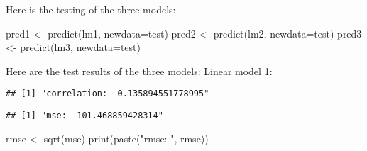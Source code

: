 \documentclass[
]{article}
\newenvironment{Shaded}{\begin{snugshade}}{\end{snugshade}}
\newcommand{\AttributeTok}[1]{\textcolor[rgb]{0.77,0.63,0.00}{#1}}
\newcommand{\DecValTok}[1]{\textcolor[rgb]{0.00,0.00,0.81}{#1}}
\newcommand{\FunctionTok}[1]{\textcolor[rgb]{0.00,0.00,0.00}{#1}}
\newcommand{\NormalTok}[1]{#1}
\newcommand{\OtherTok}[1]{\textcolor[rgb]{0.56,0.35,0.01}{#1}}
\newcommand{\SpecialCharTok}[1]{\textcolor[rgb]{0.00,0.00,0.00}{#1}}
\newcommand{\StringTok}[1]{\textcolor[rgb]{0.31,0.60,0.02}{#1}}
\begin{document}
Here is the testing of the three models:

\begin{Shaded}
\begin{Highlighting}[]
\NormalTok{pred1 }\OtherTok{\textless{}{-}} \FunctionTok{predict}\NormalTok{(lm1, }\AttributeTok{newdata=}\NormalTok{test)}
\NormalTok{pred2 }\OtherTok{\textless{}{-}} \FunctionTok{predict}\NormalTok{(lm2, }\AttributeTok{newdata=}\NormalTok{test)}
\NormalTok{pred3 }\OtherTok{\textless{}{-}} \FunctionTok{predict}\NormalTok{(lm3, }\AttributeTok{newdata=}\NormalTok{test)}
\end{Highlighting}
\end{Shaded}

Here are the test results of the three models: Linear model 1:

\begin{Shaded}
\end{Shaded}

\begin{verbatim}
## [1] "correlation:  0.135894551778995"
\end{verbatim}

\begin{Shaded}
\end{Shaded}

\begin{verbatim}
## [1] "mse:  101.468859428314"
\end{verbatim}

\begin{Shaded}
\begin{Highlighting}[]
\NormalTok{rmse }\OtherTok{\textless{}{-}} \FunctionTok{sqrt}\NormalTok{(mse)}
\FunctionTok{print}\NormalTok{(}\FunctionTok{paste}\NormalTok{(}\StringTok{"rmse: "}\NormalTok{, rmse))}
\end{Highlighting}
\end{Shaded}
\end{document}
